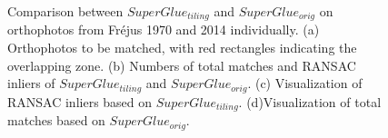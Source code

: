 \begin{figure}[htbp]
\begin{center}
{\begin{minipage}[t]{0.48\linewidth}
			\end{minipage}%
		}
		\caption{Comparison between $SuperGlue_{tiling}$ and $SuperGlue_{orig}$ on orthophotos from Fr{\'e}jus 1970 and 2014 individually. (a) Orthophotos to be matched, with red rectangles indicating the overlapping zone. (b) Numbers of total matches and RANSAC inliers of $SuperGlue_{tiling}$ and $SuperGlue_{orig}$. (c) Visualization of RANSAC inliers based on $SuperGlue_{tiling}$. (d)Visualization of total matches based on $SuperGlue_{orig}$.}
		\label{MatchOrtho}
	\end{center}
\end{figure} 

